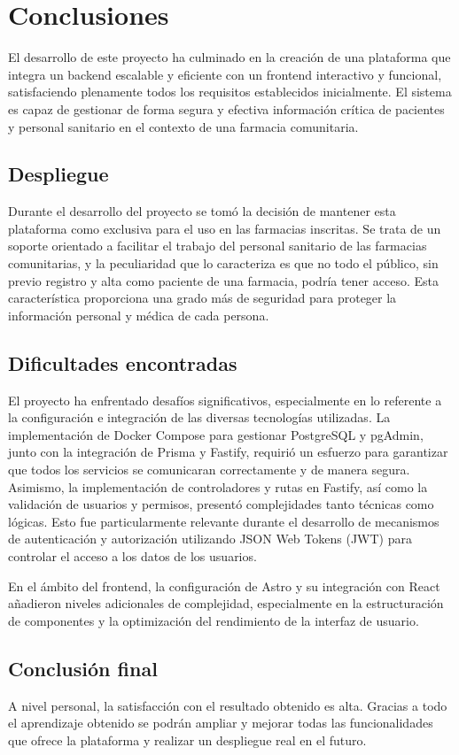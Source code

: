 \chapter{Conclusiones}
El desarrollo de este proyecto ha culminado en la creación de una plataforma que integra un backend escalable y eficiente con un frontend interactivo y funcional, satisfaciendo plenamente todos los requisitos establecidos inicialmente. El sistema es capaz de gestionar de forma segura y efectiva información crítica de pacientes y personal sanitario en el contexto de una farmacia comunitaria. 

\section{Despliegue}
Durante el desarrollo del proyecto se tomó la decisión de mantener esta plataforma como exclusiva para el uso en las farmacias inscritas. Se trata de un soporte orientado a facilitar el trabajo del personal sanitario de las farmacias comunitarias, y la peculiaridad que lo caracteriza es que no todo el público, sin previo registro y alta como paciente de una farmacia, podría tener acceso. Esta característica proporciona una grado más de seguridad para proteger la información personal y médica de cada persona.

\section{Dificultades encontradas}
El proyecto ha enfrentado desafíos significativos, especialmente en lo referente a la configuración e integración de las diversas tecnologías utilizadas. La implementación de Docker Compose para gestionar PostgreSQL y pgAdmin, junto con la integración de Prisma y Fastify, requirió un esfuerzo para garantizar que todos los servicios se comunicaran correctamente y de manera segura. Asimismo, la implementación de controladores y rutas en Fastify, así como la validación de usuarios y permisos, presentó complejidades tanto técnicas como lógicas. Esto fue particularmente relevante durante el desarrollo de mecanismos de autenticación y autorización utilizando JSON Web Tokens (JWT) para controlar el acceso a los datos de los usuarios.

En el ámbito del frontend, la configuración de Astro y su integración con React añadieron niveles adicionales de complejidad, especialmente en la estructuración de componentes y la optimización del rendimiento de la interfaz de usuario. \\


\section{Conclusión final}
A nivel personal, la satisfacción con el resultado obtenido es alta. Gracias a todo el aprendizaje obtenido se podrán ampliar y mejorar todas las funcionalidades que ofrece la plataforma y realizar un despliegue real en el futuro.